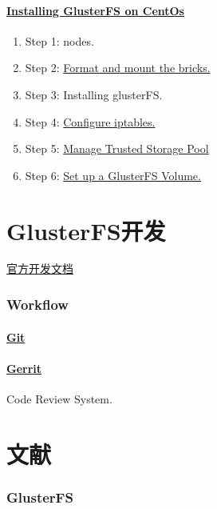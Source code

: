 \documentclass{article}
\begin{document}
\subsection{\href{https://wiki.centos.org/SpecialInterestGroup/Storage/gluster-Quickstart}{Installing GlusterFS on CentOs}}
\begin{enumerate}
\item Step 1: nodes.
\item Step 2: \href{https://gluster-documentations.readthedocs.io/en/latest/Administrator\%20Guide/Setting\%20Up\%20Volumes/}{Format and mount the bricks.}
\item Step 3: Installing glusterFS.
\item Step 4: \href{https://wiki.centos.org/HowTos/Network/IPTables}{Configure iptables.}
\item Step 5: \href{https://docs.gluster.org/en/v3/Administrator\%20Guide/Storage\%20Pools/}{Manage Trusted Storage Pool}
\item Step 6: \href{https://gluster-documentations.readthedocs.io/en/latest/Administrator\%20Guide/Setting\%20Up\%20Volumes/}{Set up a GlusterFS Volume.}
\end{enumerate}
\part{GlusterFS开发}
\href{https://docs.gluster.org/en/latest/Developer-guide/Developers-Index/\#contributing-to-the-gluster-community}{官方开发文档}
\section{Workflow}
\subsection*{\href{https://github.com/gluster/glusterfs}{Git}}
\subsection*{\href{http://review.gluster.org}{Gerrit}}
Code Review System.







\part{文献}
\section{GlusterFS}
\end{document}
